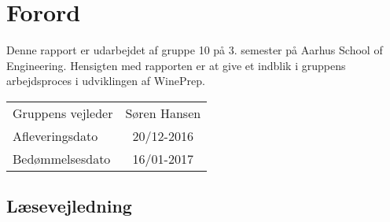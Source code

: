 \chapter*{Forord}
Denne rapport er udarbejdet af gruppe 10 på 3. semester på Aarhus School of Engineering. Hensigten med rapporten er at give et indblik i gruppens arbejdsproces i udviklingen af WinePrep.\\ %

\begin{tabular}{l c}
Gruppens vejleder & Søren Hansen\\
Afleveringsdato & 20/12-2016\\
Bedømmelsesdato & 16/01-2017\\
\end{tabular}

\section*{Læsevejledning}
